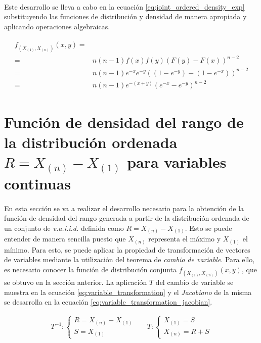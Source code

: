 \documentclass{article}
\begin{document}
      \paragraph{}
      Este desarrollo se lleva a cabo en la ecuación \eqref{eq:joint_ordered_density_exp} substituyendo las funciones de distribución y densidad de manera apropiada y aplicando operaciones algebraicas.

      \begin{align}
        \label{eq:joint_ordered_density_exp}
        \begin{split}
          f_{(X_{(1)}, X_{(n)})} (x,y) =& \\
          =& n(n-1)f(x)f(y)(F(y) - F(x))^{n-2} \\
          =& n  (n-1) e^{-x} e^{-y} ( (1 - e^{-y}) - (1 - e^{-x}) )^{n-2} \\
          =& n  (n-1) e^{-(x+y)} ( e^{-x} - e^{-y} )^{n-2}
        \end{split}
      \end{align}

  \section{Función de densidad del rango de la distribución ordenada $R = X_{(n)} - X_{(1)}$ para variables continuas}
  \label{sec:e2}

    \paragraph{}
    En esta sección se va a realizar el desarrollo necesario para la obtención de la función de densidad del rango generada a partir de la distribución ordenada de un conjunto de \emph{v.a.i.i.d.} definida como $R = X_{(n)} - X_{(1)}$. Esto se puede entender de manera sencilla puesto que $X_{(n)}$ representa el máximo y $X_{(1)}$ el mínimo. Para esto, se puede aplicar la propiedad de transformación de vectores de variables mediante la utilización del teorema de \emph{cambio de variable}. Para ello, es necesario conocer la función de distribución conjunta $f_{(X_{(1)}, X_{(n)})}(x,y)$, que se obtuvo en la sección anterior. La aplicación $T$ del cambio de variable se muestra en la ecuación \eqref{eq:variable_transformation} y el \emph{Jacobiano} de la misma se desarrolla en la ecuación \eqref{eq:variable_transformation_jacobian}.

    \begin{align}
    \label{eq:variable_transformation}
      T^{-1}:
      \begin{cases}
        R = X_{(n)} - X_{(1)} \\
        S = X_{(1)}
      \end{cases} &&
      T:
      \begin{cases}
        X_{(1)} = S \\
        X_{(n)} = R + S
      \end{cases}
    \end{align}
\end{document}
